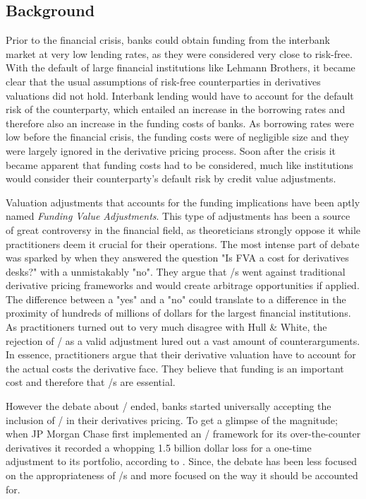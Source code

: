 \documentclass[main.tex]{subfiles}
\begin{document}
    \subsection{Background}
        
    Prior to the financial crisis, banks could obtain funding from the interbank market
    at very low lending rates, as they were considered very close to risk-free.
    With the default of large financial institutions like Lehmann Brothers, 
    it became clear that the usual assumptions of risk-free counterparties 
    in derivatives valuations did not hold.
    Interbank lending would have to account for the default risk of the counterparty,
    which entailed an increase in the borrowing rates 
    and therefore also an increase in the funding costs of banks.
    As borrowing rates were low before the financial crisis, 
    the funding costs were of negligible size 
    and they were largely ignored in the derivative pricing process.
    Soon after the crisis it became apparent that funding costs had to be considered,
    much like institutions would consider their counterparty's default risk by 
    credit value adjustments.

    Valuation adjustments that accounts for the funding implications 
    have been aptly named \textit{Funding Value Adjustments}.
    This type of adjustments has been a source of great controversy in the financial field,
    as theoreticians strongly oppose it while practitioners deem it crucial for their operations.
    The most intense part of debate was sparked by \textcite{HullWhite2012FVA}
    when they answered the question "Is FVA a cost for derivatives desks?" 
    with a unmistakably "no".
    They argue that \FVA/s went against traditional derivative pricing frameworks
    and would create arbitrage opportunities if applied.
    The difference between a "yes" and a "no" could translate to a difference 
    in the proximity of hundreds of millions of dollars for the largest financial institutions.
    As practitioners turned out to very much disagree with Hull \& White,
    the rejection of \FVA/ as a valid adjustment lured out a vast amount of counterarguments.
    In essence, practitioners argue that their derivative valuation 
    have to account for the actual costs the derivative face.
    They believe that funding is an important cost and therefore that \FVA/s are essential.

    However the debate about \FVA/ ended, banks started universally accepting the inclusion of \FVA/
    in their derivatives pricing.
    To get a glimpse of the magnitude; when JP Morgan Chase first implemented an \FVA/ framework
    for its over-the-counter derivatives it recorded a whopping 1.5 billion dollar loss
    for a one-time adjustment to its portfolio, according to \textcite{JPMorganEarnings}.
    Since, the debate has been less focused on the appropriateness of \FVA/s
    and more focused on the way it should be accounted for.
\end{document}
